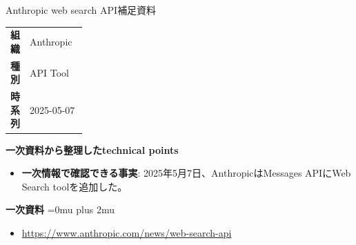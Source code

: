 \begin{technicalnote}{Anthropic web search API}{補足資料}
\begingroup
\begin{tabularx}{\linewidth}{@{}>{\bfseries}p{0.22\linewidth}X@{}}
組織 & Anthropic \\
種別 & API Tool \\
時系列 & 2025-05-07 \\
\end{tabularx}
\smallskip
{\bfseries 一次資料から整理したtechnical points}
\begin{itemize}[leftmargin=1.5em,itemsep=0.35em]
\item \textbf{一次情報で確認できる事実}: 2025年5月7日、AnthropicはMessages APIにWeb Search toolを追加した。
\end{itemize}
\begin{samepage}
{\bfseries 一次資料}
\begingroup\sloppy
\Urlmuskip=0mu plus 2mu\relax
\begin{itemize}[leftmargin=1.5em,itemsep=0.25em]
\item {\scriptsize\url{https://www.anthropic.com/news/web-search-api}}
\end{itemize}
\endgroup
\end{samepage}
\endgroup
\end{technicalnote}
\medskip
